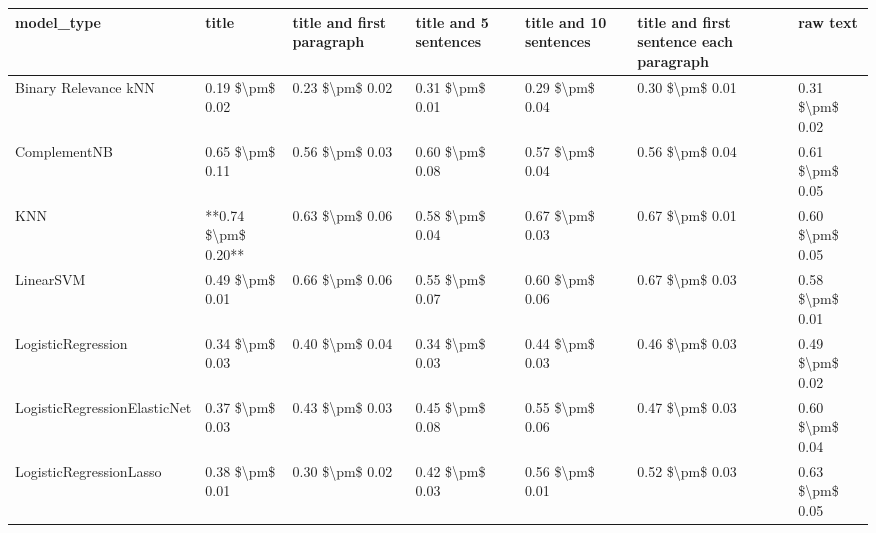 \begin{tabular}{lllllll}
\toprule
                     model\_type &               title & title and first paragraph & title and 5 sentences & title and 10 sentences & title and first sentence each paragraph &        raw text \\
\midrule
           Binary Relevance kNN &     0.19 \$\textbackslash pm\$ 0.02 &           0.23 \$\textbackslash pm\$ 0.02 &       0.31 \$\textbackslash pm\$ 0.01 &        0.29 \$\textbackslash pm\$ 0.04 &                         0.30 \$\textbackslash pm\$ 0.01 & 0.31 \$\textbackslash pm\$ 0.02 \\
                   ComplementNB &     0.65 \$\textbackslash pm\$ 0.11 &           0.56 \$\textbackslash pm\$ 0.03 &       0.60 \$\textbackslash pm\$ 0.08 &        0.57 \$\textbackslash pm\$ 0.04 &                         0.56 \$\textbackslash pm\$ 0.04 & 0.61 \$\textbackslash pm\$ 0.05 \\
                            KNN & **0.74 \$\textbackslash pm\$ 0.20** &           0.63 \$\textbackslash pm\$ 0.06 &       0.58 \$\textbackslash pm\$ 0.04 &        0.67 \$\textbackslash pm\$ 0.03 &                         0.67 \$\textbackslash pm\$ 0.01 & 0.60 \$\textbackslash pm\$ 0.05 \\
                      LinearSVM &     0.49 \$\textbackslash pm\$ 0.01 &           0.66 \$\textbackslash pm\$ 0.06 &       0.55 \$\textbackslash pm\$ 0.07 &        0.60 \$\textbackslash pm\$ 0.06 &                         0.67 \$\textbackslash pm\$ 0.03 & 0.58 \$\textbackslash pm\$ 0.01 \\
             LogisticRegression &     0.34 \$\textbackslash pm\$ 0.03 &           0.40 \$\textbackslash pm\$ 0.04 &       0.34 \$\textbackslash pm\$ 0.03 &        0.44 \$\textbackslash pm\$ 0.03 &                         0.46 \$\textbackslash pm\$ 0.03 & 0.49 \$\textbackslash pm\$ 0.02 \\
   LogisticRegressionElasticNet &     0.37 \$\textbackslash pm\$ 0.03 &           0.43 \$\textbackslash pm\$ 0.03 &       0.45 \$\textbackslash pm\$ 0.08 &        0.55 \$\textbackslash pm\$ 0.06 &                         0.47 \$\textbackslash pm\$ 0.03 & 0.60 \$\textbackslash pm\$ 0.04 \\
        LogisticRegressionLasso &     0.38 \$\textbackslash pm\$ 0.01 &           0.30 \$\textbackslash pm\$ 0.02 &       0.42 \$\textbackslash pm\$ 0.03 &        0.56 \$\textbackslash pm\$ 0.01 &                         0.52 \$\textbackslash pm\$ 0.03 & 0.63 \$\textbackslash pm\$ 0.05 \\

\end{tabular}
